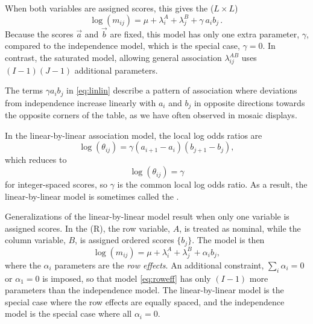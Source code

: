 \documentclass[11pt]{book}\usepackage[]{graphicx}\usepackage[]{color}
\begin{document}
When both variables are assigned scores, this gives the 
($L \times L$)
\begin{equation}\label{eq:linlin}
\log ( m_{ij} ) = \mu  +  \lambda_i^A
+  \lambda_j^B  +  \gamma \: a_i b_j \period
\end{equation}
Because the scores $\vec{a}$ and $\vec{b}$
are fixed, this model has only one extra parameter, $\gamma$, compared to the
independence model, which is the special case, $\gamma=0$.  In contrast,
the saturated model, allowing general association $\lambda_{ij}^{AB}$
uses $(I-1)(J-1)$ additional parameters.

The terms  $\gamma a_i b_j $ in \eqref{eq:linlin}
describe a pattern of association
where deviations from independence increase linearly with $a_i$
and $b_j$ in opposite directions towards the opposite corners of
the table, as we have often observed in mosaic displays.

In the linear-by-linear association model, the local log odds ratios
are
\begin{equation*}
\log (\theta_{ij}) =
 \gamma (a_{i+1} - a_i) (b_{j+1} - b_j)
 \comma
\end{equation*}
which reduces to
\begin{equation*}
\log (\theta_{ij}) =
 \gamma
\end{equation*}
for integer-spaced scores, so $\gamma$ is the common local log odds ratio.
As a result, the linear-by-linear model is sometimes called the
 \citep{Goodman:79}.

Generalizations of the linear-by-linear model result when only one
variable is assigned scores.
In the  (R),
the row variable, $A$, is treated as nominal, while
the column variable, $B$, is assigned ordered scores $\{b_j\}$.
The \loglin model is then
\begin{equation}\label{eq:roweff}
 \log ( m_{ij} ) = \mu  +  \lambda_i^A
  +  \lambda_j^B  +  \alpha_i b_j
 \comma
\end{equation}
where the $\alpha_i$ parameters are the \emph{row effects}.
An additional constraint,
$\sum_i \alpha_i =0$ or $\alpha_1 =0$
is imposed, so that model \eqref{eq:roweff}
has only $(I-1)$ more parameters than the independence model.
The linear-by-linear model is the special case where the row effects
are equally spaced, and the independence model is the special case
where all $\alpha_i = 0$.
\end{document}
